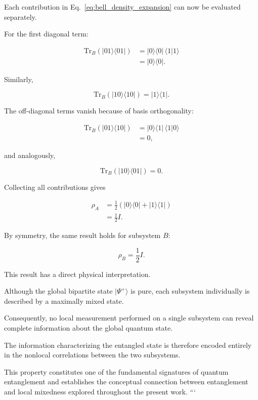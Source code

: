 Each contribution in Eq.~\eqref{eq:bell_density_expansion} can now be evaluated separately.

\medskip

For the first diagonal term:

\begin{align}
\mathrm{Tr}_B
\left(
|01\rangle \langle 01|
\right)
&=
|0\rangle \langle 0|
\,
\langle 1|1\rangle
\nonumber
\\
&=
|0\rangle \langle 0|.
\end{align}

Similarly,

\begin{equation}
\mathrm{Tr}_B
\left(
|10\rangle \langle 10|
\right)
=
|1\rangle \langle 1|.
\end{equation}

The off-diagonal terms vanish because of basis orthogonality:

\begin{align}
\mathrm{Tr}_B
\left(
|01\rangle \langle 10|
\right)
&=
|0\rangle \langle 1|
\,
\langle 1|0\rangle
\nonumber
\\
&=
0,
\end{align}

and analogously,

\begin{equation}
\mathrm{Tr}_B
\left(
|10\rangle \langle 01|
\right)
=
0.
\end{equation}

Collecting all contributions gives

\begin{align}
\rho_A
&=
\frac{1}{2}
\left(
|0\rangle \langle 0|
+
|1\rangle \langle 1|
\right)
\nonumber
\\
&=
\frac{1}{2} I.
\label{eq:reduced_density_maximally_mixed}
\end{align}

By symmetry, the same result holds for subsystem \( B \):

\begin{equation}
\rho_B
=
\frac{1}{2} I.
\label{eq:reduced_density_B_maximally_mixed}
\end{equation}

\medskip

This result has a direct physical interpretation.

Although the global bipartite state \( |\Psi^+\rangle \) is pure, each subsystem individually is described by a maximally mixed state.

Consequently, no local measurement performed on a single subsystem can reveal complete information about the global quantum state.

The information characterizing the entangled state is therefore encoded entirely in the nonlocal correlations between the two subsystems.

\medskip

This property constitutes one of the fundamental signatures of quantum entanglement and establishes the conceptual connection between entanglement and local mixedness explored throughout the present work.
```
